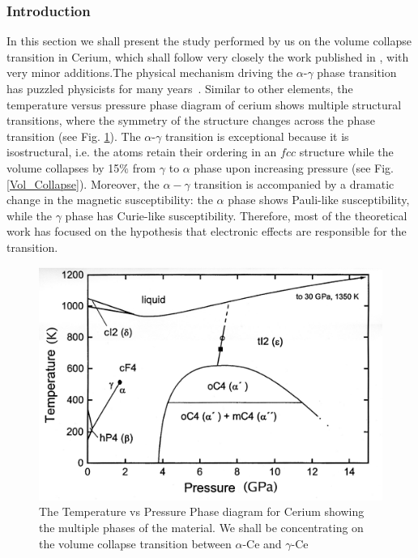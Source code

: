 \documentclass[10pt]{ruthesis}
\begin{document}
{\subsubsection{Introduction}
In this section we shall present the study performed by us on the volume collapse transition in Cerium, which shall follow very closely the work published in \cite{Chakrabarti_Cerium}, with very minor additions.The physical mechanism driving the $\alpha$-$\gamma$ phase transition
has puzzled physicists for many years~\cite{ceriumREV}.  Similar to
other elements, the temperature versus pressure phase diagram of
cerium shows multiple structural transitions, where the symmetry of
the structure changes across the phase transition (see Fig. \ref{Cerium_phase}). The
$\alpha$-$\gamma$ transition is exceptional because it is
isostructural, i.e. the atoms retain their ordering in an $fcc$
structure while the volume collapses by 15$\%$ from $\gamma$ to
$\alpha$ phase upon increasing pressure (see Fig. \ref{Vol_Collapse}).
Moreover, the $\alpha-\gamma$ transition is accompanied by a dramatic
change in the magnetic susceptibility: the $\alpha$ phase shows
Pauli-like susceptibility, while the $\gamma$ phase has Curie-like
susceptibility. Therefore, most of the theoretical work has focused on
the hypothesis that electronic effects are responsible for the
transition.
\begin{figure}[H]
\includegraphics[width=0.9\columnwidth]{Cerium_phase_diagram.jpg}
\caption{The Temperature vs Pressure Phase diagram for Cerium showing the multiple phases of the material. We shall be concentrating on the volume collapse transition between $\alpha$-Ce and $\gamma$-Ce \label{Cerium_phase}}
\end{figure}

}
\end{document}
